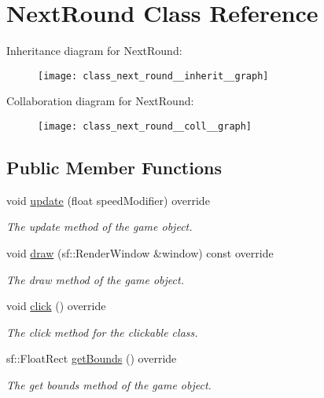 \hypertarget{class_next_round}{\section{Next\+Round Class Reference}
\label{class_next_round}
}


Inheritance diagram for Next\+Round\+:\nopagebreak
\begin{figure}[H]
\begin{center}
\leavevmode
\texttt{[image: class\_next\_round\_\_inherit\_\_graph]}
\end{center}
\end{figure}


Collaboration diagram for Next\+Round\+:\nopagebreak
\begin{figure}[H]
\begin{center}
\leavevmode
\texttt{[image: class\_next\_round\_\_coll\_\_graph]}
\end{center}
\end{figure}
\subsection*{Public Member Functions}
\begin{DoxyCompactItemize}
\item 
void \hyperlink{class_next_round_ab6c2cb6a601f19c9898f962973c765c2}{update} (float speed\+Modifier) override
\begin{DoxyCompactList}\small\item\em The update method of the game object. \end{DoxyCompactList}\item 
void \hyperlink{class_next_round_a53759483573d0d90ff07900643b01889}{draw} (sf\+::\+Render\+Window \&window) const override
\begin{DoxyCompactList}\small\item\em The draw method of the game object. \end{DoxyCompactList}\item 
void \hyperlink{class_next_round_a4a8032a6c21bdf374edd7cd4551ce970}{click} () override
\begin{DoxyCompactList}\small\item\em The click method for the clickable class. \end{DoxyCompactList}\item 
sf\+::\+Float\+Rect \hyperlink{class_next_round_adddbc077e18c8b2911e85843aaa4d611}{get\+Bounds} () override
\begin{DoxyCompactList}\small\item\em The get bounds method of the game object. \end{DoxyCompactList}\end{DoxyCompactItemize}
